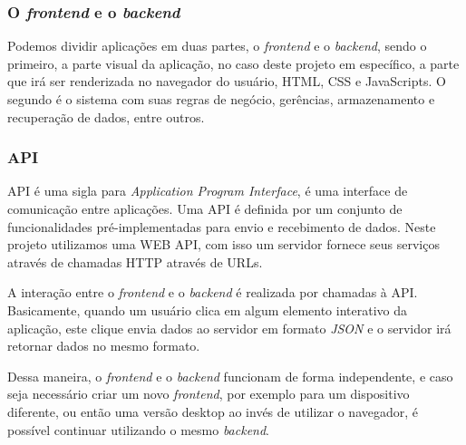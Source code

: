 		
		\subsubsection{O \textit{frontend} e o \textit{backend}}
			Podemos dividir aplicações em duas partes, o \textit{frontend} e o \textit{backend}, sendo o primeiro, a parte visual da aplicação, no caso deste projeto em específico, a parte que irá ser renderizada no navegador do usuário, HTML, CSS e JavaScripts. O segundo é o sistema com suas regras de negócio, gerências, armazenamento e recuperação de dados, entre outros.

		\subsubsection{API}

			API é uma sigla para \textit{Application Program Interface}, é uma interface de comunicação entre aplicações. Uma API é definida por um conjunto de funcionalidades pré-implementadas para envio e recebimento de dados. Neste projeto utilizamos uma WEB API, com isso um servidor fornece seus serviços através de chamadas HTTP através de URLs.

			A interação entre o \textit{frontend} e o \textit{backend} é realizada por chamadas à API. Basicamente, quando um usuário clica em algum elemento interativo da aplicação, este clique envia dados ao servidor em formato \textit{JSON} e o servidor irá retornar dados no mesmo formato.

			Dessa maneira, o \textit{frontend} e o \textit{backend} funcionam de forma independente, e caso seja necessário criar um novo \textit{frontend}, por exemplo para um dispositivo diferente, ou então uma versão desktop ao invés de utilizar o navegador, é possível continuar utilizando o mesmo \textit{backend}.

